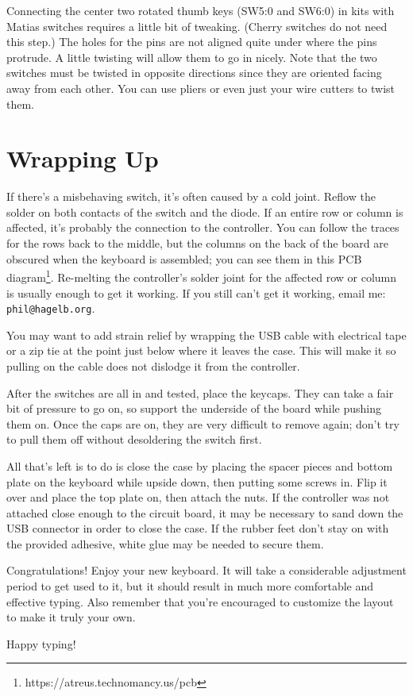 \documentclass[landscape,twocolumn]{article}
\begin{document}
Connecting the center two rotated thumb keys (SW5:0 and SW6:0) in kits
with Matias switches requires a little bit of tweaking. (Cherry
switches do not need this step.) The holes for the pins are not
aligned quite under where the pins protrude. A little twisting will
allow them to go in nicely. Note that the two switches must be twisted
in opposite directions since they are oriented facing away from each
other. You can use pliers or even just your wire cutters to twist
them.

\section{Wrapping Up}

If there's a misbehaving switch, it's often caused by a cold
joint. Reflow the solder on both contacts of the switch and the
diode. If an entire row or column is affected, it's probably the
connection to the controller. You can follow the traces for the rows
back to the middle, but the columns on the back of the board are
obscured when the keyboard is assembled; you can see them in this PCB
diagram\footnote{https://atreus.technomancy.us/pcb}. Re-melting the
controller's solder joint for the affected row or column is usually
enough to get it working. If you still can't
get it working, email me: \texttt{phil@hagelb.org}.

\vspace{1em}

You may want to add strain relief by wrapping the USB cable with
electrical tape or a zip tie at the point just below where it leaves
the case. This will make it so pulling on the cable does not dislodge
it from the controller.

\vspace{1em}

After the switches are all in and tested, place the keycaps. They can
take a fair bit of pressure to go on, so support the underside of the
board while pushing them on. Once the caps are on, they are very
difficult to remove again; don't try to pull them off without
desoldering the switch first.

\vspace{1em}

All that's left is to do is close the case by placing the spacer
pieces and bottom plate on the keyboard while upside down, then
putting some screws in. Flip it over and place the top plate on, then
attach the nuts. If the controller was not attached close enough to
the circuit board, it may be necessary to sand down the USB connector
in order to close the case. If the rubber feet don't stay on with the
provided adhesive, white glue may be needed to secure them.

\vspace{1em}

Congratulations! Enjoy your new keyboard. It will take a
considerable adjustment period to get used to it, but it should result
in much more comfortable and effective typing. Also remember that
you're encouraged to customize the layout to make it truly your
own.

\vspace{1em}

Happy typing!
\end{document}
